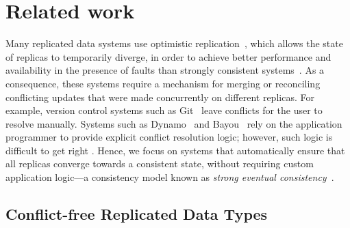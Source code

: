 \documentclass[sigplan,anonymous]{acmart}
\begin{document}
\section{Related work}\label{sec:relwork}

Many replicated data systems use optimistic replication~\cite{Saito:2005jw}, which allows the state of replicas to temporarily diverge, in order to achieve better performance and availability in the presence of faults than strongly consistent systems~\cite{Bailis:2014th,Gilbert:2002il}.
As a consequence, these systems require a mechanism for merging or reconciling conflicting updates that were made concurrently on different replicas.
For example, version control systems such as Git~\cite{Chacon:2014kr} leave conflicts for the user to resolve manually.
Systems such as Dynamo~\cite{DeCandia:2007ui} and Bayou~\cite{Terry:1995dn} rely on the application programmer to provide explicit conflict resolution logic; however, such logic is difficult to get right \cite{Bailis:2013jc,Burckhardt:2014hy,Gomes:2017gy}.
Hence, we focus on systems that automatically ensure that all replicas converge towards a consistent state, without requiring custom application logic---a consistency model known as \emph{strong eventual consistency}~\cite{Shapiro:2011un,Gomes:2017gy}.

\subsection{Conflict-free Replicated Data Types}
\end{document}
